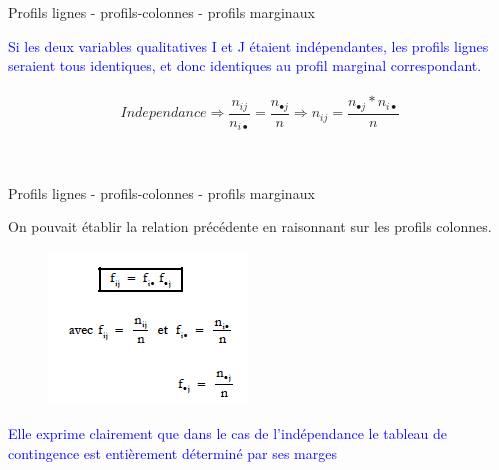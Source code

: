 \documentclass[11pt]{beamer}
\begin{document}
%
%


\begin{frame}{Profils lignes - profils-colonnes - profils
marginaux}

\textcolor{blue}{Si les deux variables qualitatives I et J étaient indépendantes, les profils lignes seraient tous identiques, et donc identiques au profil marginal
correspondant.}\\~\\

$$Independance \Rightarrow \frac{n_{ij}}{n_{i \bullet}}=\frac{n_{\bullet j}}{n} \Rightarrow n_{ij}=\frac{n_{\bullet j}*n_{i \bullet}}{n}$$\\~\\

\end{frame}


\begin{frame}{Profils lignes - profils-colonnes - profils
marginaux}

   On pouvait établir la relation précédente en raisonnant sur les profils colonnes.
 
\begin{figure}
\includegraphics[scale=0.7]{Exemple5.png}  
\end{figure}
 

\textcolor{blue}{Elle exprime clairement que dans le cas de l’indépendance le tableau de contingence est entièrement déterminé par ses marges}
\end{frame}
\end{document}

